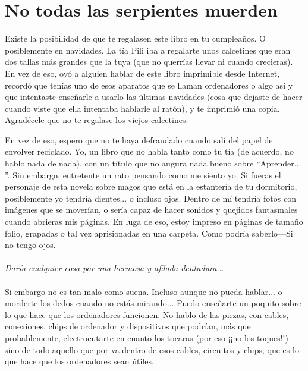 

\chapter{No todas las serpientes muerden}\label{ch:notallsnakeswillsquishyou}

Existe la posibilidad de que te regalasen este libro en tu cumpleaños. O posiblemente en navidades. La tía Pili iba a regalarte unos calcetines que eran dos tallas más grandes que la tuya (que no querrías llevar ni cuando crecieras). En vez de eso, oyó a alguien hablar de este libro imprimible desde Internet, recordó que tenías uno de esos aparatos que se llaman ordenadores o algo así y que intentaste enseñarle a usarlo las últimas navidades (cosa que dejaste de hacer cuando viste que ella intentaba hablarle al ratón), y te imprimió una copia. Agradécele que no te regalase los viejos calcetines.

En vez de eso, espero que no te haya defraudado cuando salí del papel de envolver reciclado. Yo, un libro que no habla tanto como tu tía (de acuerdo, no hablo nada de nada), con un título que no augura nada bueno sobre ``Aprender$\ldots$''.
Sin embargo, entretente un rato pensando como me siento yo. Si fueras el personaje de esta novela sobre magos que está en la estantería de tu dormitorio, posiblemente yo tendría dientes... o incluso ojos. Dentro de mí tendría fotos con imágenes que se moverían, o sería capaz de hacer sonidos y quejidos fantasmales cuando abrieras mis páginas. En luga de eso, estoy impreso en páginas de tamaño folio, grapadas o tal vez aprisionadas en una carpeta. Como podría saberlo---Si no tengo ojos.
\\
\\
\emph{Daría cualquier cosa por una hermosa y afilada dentadura$\ldots$}
\\
\\
Si embargo no es tan malo como suena. Incluso aunque no pueda hablar... o morderte los dedos cuando no estás mirando... Puedo enseñarte un poquito sobre lo que hace que los ordenadores funcionen. No hablo de las piezas, con cables, conexiones, chips de ordenador y dispositivos que podrían, más que probablemente, electrocutarte en cuanto los tocaras (por eso ¡¡no los toques!!)---sino de todo aquello que por va dentro de esos cables, circuitos y chips, que es lo que hace que los ordenadores sean útiles.

